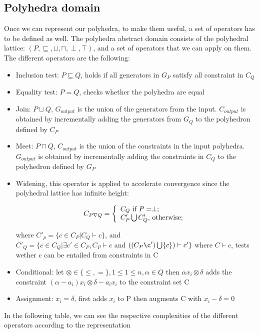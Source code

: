 \subsection{Polyhedra domain}
Once we can represent our polyhedra, to make them useful, a set of operators has to be defined as well. The polyhedra abstract domain consists of the polyhedral lattice:
    $(P,\sqsubseteq,\sqcup,\sqcap,\perp,\top)$, and a set of operators that we can apply on them. The different operators are the following:
    \begin{itemize}
        \item Inclusion test: $P \sqsubseteq Q$, holds if all generators in $G_P$ satisfy all constraint in $C_Q$
        \item Equality test: $P=Q$, checks whether the polyhedra are equal
        \item Join: $P\sqcup Q$, $G_{output}$ is the union of the generators from the input. $C_{output}$ is obtained by incrementally adding the generators from $G_Q$ to the polyhedron defined by $C_P$
        \item Meet: $P\sqcap Q$, $C_{output}$ is the union of the constraints in the input polyhedra. $G_{output}$ is obtained by incrementally adding the constraints in $C_Q$ to the polyhedron defined by $G_P$
        \item Widening, this operator is applied to accelerate convergence since the polyhedral lattice has infinite height:
		\begin{center}
		  \[
    C_{P\nabla Q}=\left\{
                \begin{array}{ll}
                  C_Q $ if $P=\perp ;\\
                  C'_P\bigcup C'_Q, $ otherwise$;
                \end{array}
              \right.
  	\]
		
        \end{center}

        where $C'_p=\{c\in C_P |C_Q \vdash c \}$, and\\  $C'_Q=\{c\in C_Q |\exists c' \in C_P,C_P \vdash c $ and $((C_P\c')\bigcup \{c\})\vdash c' \}$
        where $C\vdash c$, tests wether c can be entailed from constraints in C
        \item Conditional: let $\otimes \in \{\leq,=\},1\leq 1\leq n,\alpha \in Q$ then $\alpha x_i \otimes \delta$ adds the constraint $(\alpha-a_i)x_i \otimes\delta - a_i x_i$ to the constraint set C
        \item Assignment: $x_i = \delta$, first adds $x_i$ to P then augments C with $x_i -\delta = 0$
        
    \end{itemize}
     In the following table, we can see the respective complexities of the different operators according to the representation
	 
